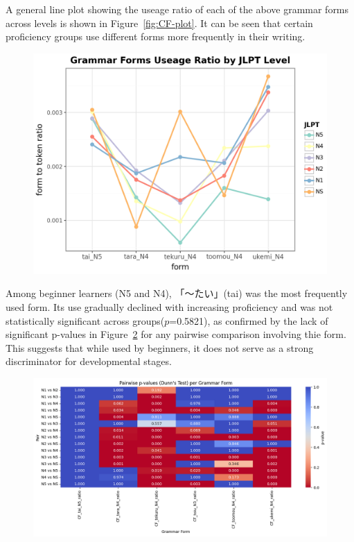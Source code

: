A general line plot showing the useage ratio of each of the above grammar forms across levels is shown in
Figure~\ref{fig:CF-plot}. It can be seen that certain proficiency groups use different forms more frequently in
their writing.

\begin{figure}[h]
\centering
\includegraphics[scale=.5]{img/CF-plot}
\caption[The use of the top 5 frequently used grammar forms across JLPT levels]{}
\label{fig:CFplot}
\end{figure}


Among beginner learners (N5 and N4), 「〜たい」(tai) was the most frequently used form. Its use gradually declined with
increasing proficiency and was not statistically significant across groups($p$=0.5821), as confirmed by the lack of
significant p-values in Figure~\ref{fig:CFheatmap} for any pairwise comparison involving thie form. This suggests that
while used by beginners, it does not serve as a strong discriminator for developmental stages.


\begin{figure}[h!]
\centering
\includegraphics[scale=.4]{img/CFheatmap}
\caption[Heatmap of top 5 grammar forms]{}
\label{fig:CFheatmap}
\end{figure}

